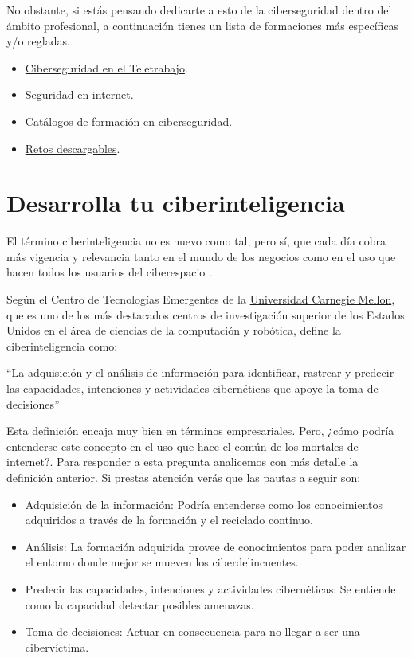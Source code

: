 \documentclass[
  spanish,
  a4paper,
  openany]{book}
\begin{document}
No obstante, si estás pensando dedicarte a esto de la ciberseguridad dentro del ámbito profesional, a continuación tienes un lista de formaciones más específicas y/o regladas.

\begin{itemize}
\item
  \href{https://learndigital.withgoogle.com/activate/course/cybersecurity-remote-work}{Ciberseguridad en el Teletrabajo}.
\item
  \href{https://www.cualifica2.es/cursos/Curso-Seguridad-En-Internet}{Seguridad en internet}.
\item
  \href{https://www.incibe.es/catalogos-formacion-ciberseguridad}{Catálogos de formación en ciberseguridad}.
\item
  \href{https://www.incibe.es/academiahacker/retosdescargables}{Retos descargables}.
\end{itemize}

\hypertarget{desarrolla-tu-ciberinteligencia}{%
\section{Desarrolla tu ciberinteligencia}\label{desarrolla-tu-ciberinteligencia}}

El término ciberinteligencia no es nuevo como tal, pero sí, que cada día cobra más vigencia y relevancia tanto en el mundo de los negocios como en el uso que hacen todos los usuarios del ciberespacio \citep{ciberinteligencia}.

Según el Centro de Tecnologías Emergentes de la \href{https://es.wikipedia.org/wiki/Universidad_Carnegie_Mellon}{Universidad Carnegie Mellon}, que es uno de los más destacados centros de investigación superior de los Estados Unidos en el área de ciencias de la computación y robótica, define la ciberinteligencia como:

``La adquisición y el análisis de información para identificar, rastrear y predecir las capacidades, intenciones y actividades cibernéticas que apoye la toma de decisiones''

Esta definición encaja muy bien en términos empresariales. Pero, ¿cómo podría entenderse este concepto en el uso que hace el común de los mortales de internet?. Para responder a esta pregunta analicemos con más detalle la definición anterior. Si prestas atención verás que las pautas a seguir son:

\begin{itemize}
\item
  Adquisición de la información: Podría entenderse como los conocimientos adquiridos a través de la formación y el reciclado continuo.
\item
  Análisis: La formación adquirida provee de conocimientos para poder analizar el entorno donde mejor se mueven los ciberdelincuentes.
\item
  Predecir las capacidades, intenciones y actividades cibernéticas: Se entiende como la capacidad detectar posibles amenazas.
\item
  Toma de decisiones: Actuar en consecuencia para no llegar a ser una cibervíctima.
\end{itemize}
\end{document}
